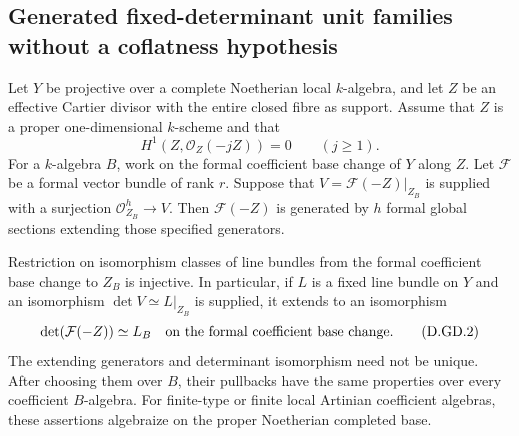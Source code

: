 \subsection{Generated fixed-determinant unit families without a coflatness hypothesis}

\begin{lemma}
\label{D:weak-cycle-generated-determinant-lifting}
Let $Y$ be projective over a complete Noetherian local
$k$-algebra, and let $Z$ be an effective Cartier divisor
with the entire closed fibre as support. Assume that $Z$
is a proper one-dimensional $k$-scheme and that
\[
             H^1(Z,\mathcal O_Z(-jZ))=0\qquad(j\ge1).
                                                        \tag{D.GD.1}
\]
For a $k$-algebra $B$, work on the formal coefficient base
change of $Y$ along $Z$. Let $\mathcal F$ be a formal
vector bundle of rank $r$. Suppose that
$V=\mathcal F(-Z)|_{Z_B}$ is supplied with a surjection
$\mathcal O_{Z_B}^{h}\to V$. Then $\mathcal F(-Z)$ is
generated by $h$ formal global sections extending those
specified generators.

Restriction on isomorphism classes of line bundles from
the formal coefficient base change to $Z_B$ is injective.
In particular, if $L$ is a fixed line bundle on $Y$ and
an isomorphism $\det V\simeq L|_{Z_B}$ is supplied, it
extends to an isomorphism
\[
             \det(\mathcal F(-Z))\simeq L_B
\quad\hbox{on the formal coefficient base change}.       \tag{D.GD.2}
\]
The extending generators and determinant isomorphism need
not be unique. After choosing them over $B$, their pullbacks
have the same properties over every coefficient $B$-algebra.
For finite-type or finite local Artinian coefficient algebras,
these assertions algebraize on the proper Noetherian
completed base.
\end{lemma}

